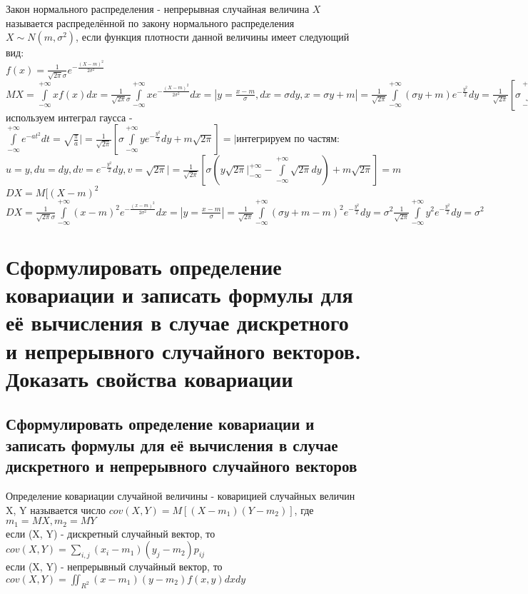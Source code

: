 Закон нормального распределения - непрерывная случайная величина $X$ называется распределённой по закону нормального распределения $X \sim N(m, \sigma^{2})$, если функция плотности данной величины имеет следующий вид:\\
$f(x) = \frac{1}{\sqrt{2\pi} \sigma} e^{-\frac{(X - m)^{2}}{2\sigma^{2}}}$\\
$MX = \int\limits_{-\infty}^{+\infty} x f(x) dx = \frac{1}{\sqrt{2\pi}\sigma} \int\limits_{-\infty}^{+\infty} x e^{-\frac{(X - m)^{2}}{2 \sigma^{2}}} dx = |y = \frac{x - m}{\sigma}, dx = \sigma dy, x = \sigma y + m| = \frac{1}{\sqrt{2\pi}} \int\limits_{-\infty}^{+\infty} (\sigma y + m) e^{-\frac{y^{2}}{2}} dy = \frac{1}{\sqrt{2\pi}}[\sigma \int\limits_{-\infty}^{+\infty} y e^{-\frac{y^{2}}{2}} dy + m \int\limits_{-\infty}^{+\infty} e^{-\frac{y^{2}}{2}} dy] = \bigg|$используем интеграл гаусса - $\int\limits_{-\infty}^{+\infty} e^{-at^{2}} dt = \sqrt{\frac{\pi}{a}}\bigg| = \frac{1}{\sqrt{2\pi}}[\sigma \int\limits_{-\infty}^{+\infty} y e^{-\frac{y^{2}}{2}} dy + m \sqrt{2\pi}] = \bigg|$интегрируем по частям: $ u = y, du = dy, dv = e^{-\frac{y^{2}}{2}} dy, v = \sqrt{2\pi} \bigg| = \frac{1}{\sqrt{2\pi}}[\sigma (y \sqrt{2\pi}\bigg|_{-\infty}^{+\infty} - \int\limits_{-\infty}^{+\infty} \sqrt{2\pi} dy) + m \sqrt{2\pi}] = m$\\
$DX = M[(X - m)^{2}$\\

$DX = \frac{1}{\sqrt{2\pi} \sigma} \int\limits_{-\infty}^{+\infty} (x - m)^{2} e ^ {-\frac{(x - m)^{2}}{2\sigma^{2}}} dx = |y = \frac{x - m}{\sigma}| = \frac{1}{\sqrt{2\pi}} \int\limits_{-\infty}^{+\infty} (\sigma y + m - m)^{2} e^{-\frac{y^{2}}{2}} dy = \sigma^{2} \frac{1}{\sqrt{2\pi}} \int\limits_{-\infty}^{+\infty} y^{2} e^{-\frac{y^{2}}{2}} dy = \sigma^{2}$\\

\section{Сформулировать определение ковариации и записать формулы для её вычисления в случае дискретного и непрерывного случайного векторов. Доказать свойства ковариации}
\subsection{Сформулировать определение ковариации и записать формулы для её вычисления в случае дискретного и непрерывного случайного векторов}
Определение ковариации случайной величины - коварицией случайных величин X, Y называется число $cov(X, Y) = M[(X - m_{1})(Y - m_{2})]$, где $m_{1} = MX, m_{2} = MY$\\
если (X, Y) - дискретный случайный вектор, то $cov(X, Y) = \sum\limits_{i,j} (x_{i} - m_{1}) (y_{j} - m_{2}) p_{ij}$\\
если (X, Y) - непрерывный случайный вектор, то $cov(X, Y) = \iint_{R^{2}} (x - m_{1})(y - m_{2}) f(x, y) dx dy$\\

